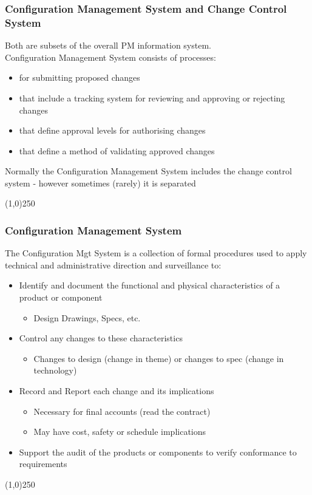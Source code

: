 \begin{frame}
\frametitle{Configuration Management System and Change Control System}
Both are subsets of the overall PM information system.\\
Configuration Management System consists of processes:\\ 
\begin{itemize}
	\item for  submitting proposed changes
	\item that include a tracking system for reviewing and approving or rejecting changes
	\item that define approval levels for authorising changes
	\item that define a method of validating approved changes
\end{itemize}
Normally the Configuration Management System includes the change control system - however sometimes (rarely) it is separated
\end{frame}\begin{center}\line(1,0){250}\end{center}
%
%



\begin{frame}
\frametitle{Configuration Management System}
The Configuration Mgt System is a collection of formal procedures used to apply technical and administrative direction and surveillance to:
\begin{itemize}
	\item Identify and document the functional and physical characteristics of a product or component 
		\begin{itemize}
			\item Design Drawings, Specs, etc.
		\end{itemize}
	\item Control any changes to these characteristics
		\begin{itemize}
			\item Changes to design (change in theme) or changes to spec (change in technology)
		\end{itemize}
	\item Record and Report each change and its implications
		\begin{itemize}
			\item Necessary for final accounts (read the contract)
			\item May have cost, safety or schedule implications
		\end{itemize}
	\item Support the audit of the products or components to verify conformance to requirements
\end{itemize}
\end{frame}\begin{center}\line(1,0){250}\end{center}
%
%

